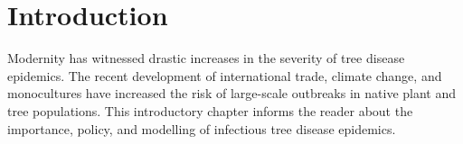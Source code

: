 
\chapter{Introduction}


Modernity has witnessed drastic increases in the severity of tree disease epidemics. 
The recent development of international trade, climate change, and monocultures have increased the risk of large-scale
outbreaks in native plant and tree populations. This introductory chapter informs the reader about the importance, policy,
and modelling of infectious tree disease epidemics.

